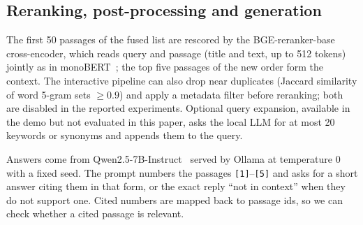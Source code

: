 \subsection{Reranking, post-processing and generation}
The first 50 passages of the fused list are rescored by the BGE-reranker-base
cross-encoder, which reads query and passage (title and text, up to 512 tokens)
jointly as in monoBERT~\cite{nogueira2019passage}; the top five passages of the
new order form the context. The interactive pipeline can also drop near
duplicates (Jaccard similarity of word 5-gram sets $\ge 0.9$) and apply a
metadata filter before reranking; both are disabled in the reported
experiments. Optional query expansion, available in the demo but not evaluated
in this paper, asks the local LLM for at most 20 keywords or synonyms and
appends them to the query.

Answers come from Qwen2.5-7B-Instruct~\cite{qwen2024qwen25} served by Ollama
at temperature 0 with a fixed seed. The prompt numbers the passages
\texttt{[1]}--\texttt{[5]} and asks for a short answer citing them in that
form, or the exact reply ``not in context'' when they do not support one.
Cited numbers are mapped back to passage ids, so we can check whether a cited
passage is relevant.
